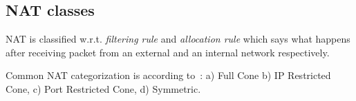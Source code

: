 \documentclass{llncs}
\begin{document}
% 
% 

\subsection{NAT classes}\label{sec:nat}
NAT is classified w.r.t. \emph{filtering rule} and \emph{allocation rule} which says what happens after receiving
packet from an external and an internal network respectively.

Common NAT categorization is according to~\citep{rfc3489}: a) Full Cone
b) IP Restricted Cone, c) Port Restricted Cone, d) Symmetric.
\end{document}
